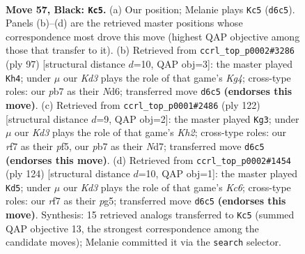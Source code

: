 \documentclass[11pt]{article}
\begin{document}
\clearpage

\begin{figure}[p]\centering
\begin{subfigure}{0.46\textwidth}\centering
\resizebox{\linewidth}{!}{%
\newchessgame
\chessboard[
  setfen={8/1P3R2/3k4/8/8/1B2K3/8/8 b - - 2 57},
  showmover=false,
  pgfstyle=straightmove, color=movearrow, markmove={d6-c5}
]}
\caption{}
\end{subfigure}\hfill
\begin{subfigure}{0.46\textwidth}\centering
\resizebox{\linewidth}{!}{%
\newchessgame
\chessboard[
  setfen={8/8/3n4/6k1/8/4K2B/1b6/5R2 b - - 16 49},
  showmover=false,
  pgfstyle=straightmove, color=movearrow, markmove={g5-h4}
]}
\caption{}
\end{subfigure}
\\[4pt]
\begin{subfigure}{0.46\textwidth}\centering
\resizebox{\linewidth}{!}{%
\newchessgame
\chessboard[
  setfen={7k/3N4/8/5p2/4b3/8/7K/8 w - - 0 62},
  showmover=false,
  pgfstyle=straightmove, color=movearrow, markmove={h2-g3}
]}
\caption{}
\end{subfigure}\hfill
\begin{subfigure}{0.46\textwidth}\centering
\resizebox{\linewidth}{!}{%
\newchessgame
\chessboard[
  setfen={8/4k3/2K5/6p1/6B1/3pb3/8/8 w - - 0 63},
  showmover=false,
  pgfstyle=straightmove, color=movearrow, markmove={c6-d5}
]}
\caption{}
\end{subfigure}
\caption{\textbf{Move 57, Black: \texttt{Kc5}.} (a) Our position; Melanie plays \texttt{Kc5} (\texttt{d6c5}). Panels (b)--(d) are the retrieved master positions whose correspondence most drove this move (highest QAP objective among those that transfer to it). (b) Retrieved from \texttt{ccrl\_top\_p0002\#3286} (ply 97) [structural distance $d$=10, QAP obj=3]: the master played \texttt{Kh4}; under $\mu$ our \emph{Kd3} plays the role of that game's \emph{Kg4}; cross-type roles: our \emph{p}b7 as their \emph{N}d6; transferred move \texttt{d6c5} \textbf{(endorses this move)}. (c) Retrieved from \texttt{ccrl\_top\_p0001\#2486} (ply 122) [structural distance $d$=9, QAP obj=2]: the master played \texttt{Kg3}; under $\mu$ our \emph{Kd3} plays the role of that game's \emph{Kh2}; cross-type roles: our \emph{r}f7 as their \emph{p}f5, our \emph{p}b7 as their \emph{N}d7; transferred move \texttt{d6c5} \textbf{(endorses this move)}. (d) Retrieved from \texttt{ccrl\_top\_p0002\#1454} (ply 124) [structural distance $d$=10, QAP obj=1]: the master played \texttt{Kd5}; under $\mu$ our \emph{Kd3} plays the role of that game's \emph{Kc6}; cross-type roles: our \emph{r}f7 as their \emph{p}g5; transferred move \texttt{d6c5} \textbf{(endorses this move)}. Synthesis: 15 retrieved analogs transferred to \texttt{Kc5} (summed QAP objective 13, the strongest correspondence among the candidate moves); Melanie committed it via the \texttt{search} selector.}
\label{fig:thought-m113}
\end{figure}
\end{document}
